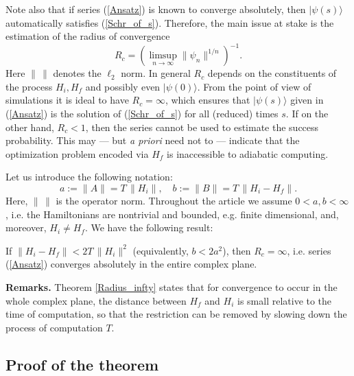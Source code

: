 \documentclass[11 pt]{article}
\begin{document}
 Note also that if series (\ref{Ansatz}) is known to converge absolutely, then $|\psi(s)\rangle$ automatically satisfies (\ref{Schr_of_s}). Therefore, the main issue at stake is the estimation of the radius of convergence
\begin{equation}\label{def_Rc}
R_{c} = \left(\limsup\limits_{n \rightarrow \infty} \|\psi_n\|^{1/n}\right)^{-1}.
\end{equation}
Here $\|\,\|$ denotes the $\ell_2$ norm. In general $R_c$ depends on the constituents of the process $H_i, H_f$ and possibly even $|\psi(0)\rangle$. From the point of view of simulations it is ideal to have $R_c = \infty$, which ensures that $|\psi(s)\rangle$ given in (\ref{Ansatz}) is the solution of (\ref{Schr_of_s}) for all (reduced) times $s$. If on the other hand, $R_c <1$, then the series  cannot be used to estimate the success probability. This may --- but \textit{a priori} need not to --- indicate that the optimization problem encoded via $H_f$ is inaccessible to adiabatic computing.

Let us introduce the following notation:
\begin{equation}
a := \|A\| = T\,\|H_i\|, \quad b := \|B\| = T\,\|H_i-H_f\|.
\end{equation}
Here, $\|\,\|$ is the operator norm. 
Throughout the article we assume $0< a,b < \infty$, i.e. the Hamiltonians are nontrivial and bounded, e.g. finite dimensional, and, moreover, $H_i\neq H_f$. We have the following result:

\begin{theorem}\label{Radius_infty}
If $\|H_i-H_f\|< 2T\,\|H_i\|^2$ (equivalently, $b< 2a^2$), then $R_c = \infty$, i.e. series (\ref{Ansatz}) converges absolutely in the entire complex plane. 
\end{theorem}
\vspace*{.2cm}

\noindent
\textbf{Remarks.}
Theorem \ref{Radius_infty} states that for convergence to occur in the whole complex plane, the distance between $H_f$ and $H_i$ is small relative to the time of computation, so that the restriction can be removed by slowing down the process of computation $T$. 


\subsection{Proof of the theorem}
\end{document}

